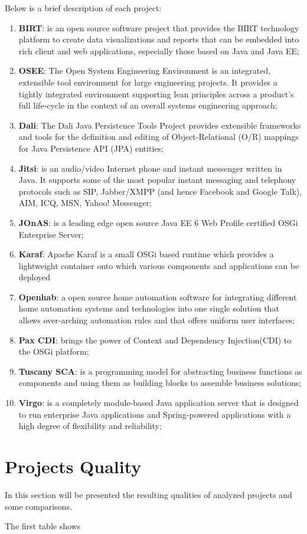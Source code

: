Below is a brief description of each project:

\begin{enumerate}
\item \textbf{BIRT}: is an open source software project that provides the BIRT technology platform to create data visualizations and reports that can be embedded into rich client and web applications, especially those based on Java and Java EE;
\item \textbf{OSEE}: The Open System Engineering Environment is an integrated, extensible tool environment for large engineering projects. It provides a tightly integrated environment supporting lean principles across a product's full life-cycle in the context of an overall systems engineering approach;
\item \textbf{Dali}: The Dali Java Persistence Tools Project provides extensible frameworks and tools for the definition and editing of Object-Relational (O/R) mappings for Java Persistence API (JPA) entities;
\item \textbf{Jitsi}: is an audio/video Internet phone and instant messenger written in Java. It supports some of the most popular instant messaging and telephony protocols such as SIP, Jabber/XMPP (and hence Facebook and Google Talk), AIM, ICQ, MSN, Yahoo! Messenger;
\item \textbf{JOnAS}: is a leading edge open source Java EE 6 Web Profile certified OSGi Enterprise Server;
\item \textbf{Karaf}: Apache Karaf is a small OSGi based runtime which provides a lightweight container onto which various components and applications can be deployed
\item \textbf{Openhab}: a open source home automation software for integrating different home automation systems and technologies into one single solution that allows over-arching automation rules and that offers uniform user interfaces;
\item \textbf{Pax CDI}: brings the power of Context and Dependency Injection(CDI) to the OSGi platform; 
\item \textbf{Tuscany SCA}: is a programming model for abstracting business functions as components and using them as building blocks to assemble business solutions; 
\item \textbf{Virgo}: is a completely module-based Java application server that is designed to run enterprise Java applications and Spring-powered applications with a high degree of flexibility and reliability; 
\end{enumerate}


\section{Projects Quality}
In this section will be presented the resulting qualities of analyzed projects and some comparisons.

The first table shows 

